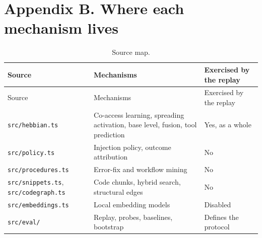 \documentclass[
  american,
  11pt,
]{article}
\begin{document}
\section*{Appendix B. Where each mechanism lives}\label{appendix-b.-where-each-mechanism-lives}

\begin{longtable}[]{@{}
  >{\raggedright\arraybackslash}p{}
  >{\raggedright\arraybackslash}p{}
  >{\raggedright\arraybackslash}p{}@{}}
\caption{Source map.}\tabularnewline
\toprule\noalign{}
\begin{minipage}[b]{\linewidth}\raggedright
Source
\end{minipage} & \begin{minipage}[b]{\linewidth}\raggedright
Mechanisms
\end{minipage} & \begin{minipage}[b]{\linewidth}\raggedright
Exercised by the replay
\end{minipage} \\
\midrule\noalign{}
\endfirsthead
\toprule\noalign{}
\begin{minipage}[b]{\linewidth}\raggedright
Source
\end{minipage} & \begin{minipage}[b]{\linewidth}\raggedright
Mechanisms
\end{minipage} & \begin{minipage}[b]{\linewidth}\raggedright
Exercised by the replay
\end{minipage} \\
\midrule\noalign{}
\endhead
\bottomrule\noalign{}
\endlastfoot
\texttt{src/hebbian.ts} & Co-access learning, spreading activation, base level, fusion, tool prediction & Yes,
as a whole \\
\texttt{src/policy.ts} & Injection policy, outcome attribution & No \\
\texttt{src/procedures.ts} & Error-fix and workflow mining & No \\
\texttt{src/snippets.ts}, \texttt{src/codegraph.ts} & Code chunks, hybrid search, structural edges & No \\
\texttt{src/embeddings.ts} & Local embedding models & Disabled \\
\texttt{src/eval/} & Replay, probes, baselines, bootstrap & Defines the protocol \\
\end{longtable}
\end{document}
